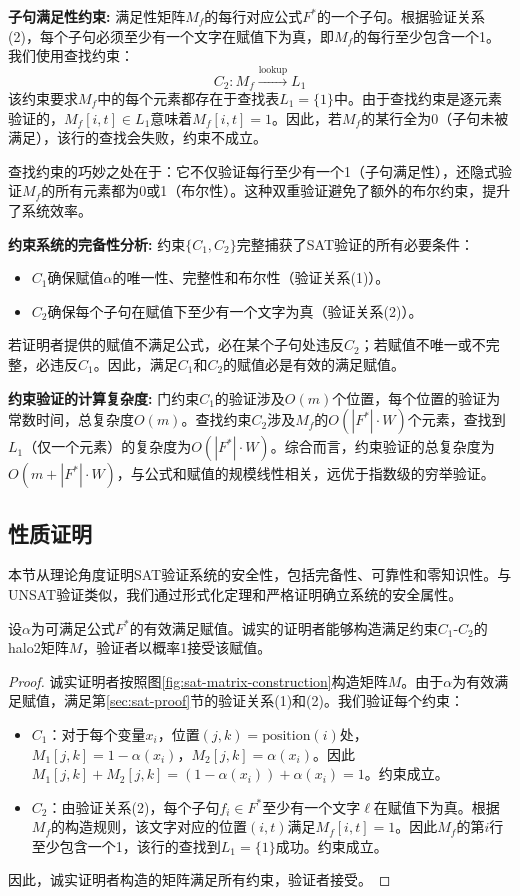 \textbf{子句满足性约束:}
满足性矩阵$M_f$的每行对应公式$F^*$的一个子句。根据验证关系(2)，每个子句必须至少有一个文字在赋值下为真，即$M_f$的每行至少包含一个1。我们使用查找约束：
$$C_2: M_f \xrightarrow{\text{lookup}} L_1$$
该约束要求$M_f$中的每个元素都存在于查找表$L_1 = \{1\}$中。由于查找约束是逐元素验证的，$M_f[i,t] \in L_1$意味着$M_f[i,t] = 1$。因此，若$M_f$的某行全为0（子句未被满足），该行的查找会失败，约束不成立。

查找约束的巧妙之处在于：它不仅验证每行至少有一个1（子句满足性），还隐式验证$M_f$的所有元素都为0或1（布尔性）。这种双重验证避免了额外的布尔约束，提升了系统效率。

\textbf{约束系统的完备性分析:}
约束$\{C_1, C_2\}$完整捕获了SAT验证的所有必要条件：
\begin{itemize}
    \item $C_1$确保赋值$\alpha$的唯一性、完整性和布尔性（验证关系(1)）。
    \item $C_2$确保每个子句在赋值下至少有一个文字为真（验证关系(2)）。
\end{itemize}
若证明者提供的赋值不满足公式，必在某个子句处违反$C_2$；若赋值不唯一或不完整，必违反$C_1$。因此，满足$C_1$和$C_2$的赋值必是有效的满足赋值。

\textbf{约束验证的计算复杂度:}
门约束$C_1$的验证涉及$O(m)$个位置，每个位置的验证为常数时间，总复杂度$O(m)$。查找约束$C_2$涉及$M_f$的$O(|F^*| \cdot W)$个元素，查找到$L_1$（仅一个元素）的复杂度为$O(|F^*| \cdot W)$。综合而言，约束验证的总复杂度为$O(m + |F^*| \cdot W)$，与公式和赋值的规模线性相关，远优于指数级的穷举验证。

\subsection{性质证明}\label{sec:sat-security}

本节从理论角度证明SAT验证系统的安全性，包括完备性、可靠性和零知识性。与UNSAT验证类似，我们通过形式化定理和严格证明确立系统的安全属性。

\begin{theorem}[SAT验证的完备性]
设$\alpha$为可满足公式$F^*$的有效满足赋值。诚实的证明者能够构造满足约束$C_1$-$C_2$的halo2矩阵$M$，验证者以概率1接受该赋值。
\end{theorem}

\begin{proof}
诚实证明者按照图\ref{fig:sat-matrix-construction}构造矩阵$M$。由于$\alpha$为有效满足赋值，满足第\ref{sec:sat-proof}节的验证关系(1)和(2)。我们验证每个约束：
\begin{itemize}
    \item $C_1$：对于每个变量$x_i$，位置$(j,k) = \text{position}(i)$处，$M_1[j,k] = 1 - \alpha(x_i)$，$M_2[j,k] = \alpha(x_i)$。因此$M_1[j,k] + M_2[j,k] = (1 - \alpha(x_i)) + \alpha(x_i) = 1$。约束成立。
    \item $C_2$：由验证关系(2)，每个子句$f_i \in F^*$至少有一个文字$\ell$在赋值下为真。根据$M_f$的构造规则，该文字对应的位置$(i,t)$满足$M_f[i,t] = 1$。因此$M_f$的第$i$行至少包含一个1，该行的查找到$L_1 = \{1\}$成功。约束成立。
\end{itemize}
因此，诚实证明者构造的矩阵满足所有约束，验证者接受。
\end{proof}


